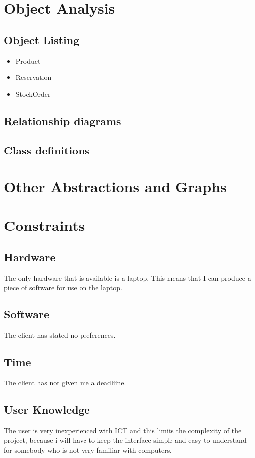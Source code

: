 \section{Object Analysis}


\subsection{Object Listing}
\begin{itemize}
	\item Product
	\item Reservation
	\item StockOrder
\end{itemize}
\subsection{Relationship diagrams}

\subsection{Class definitions}

\section{Other Abstractions and Graphs}

\section{Constraints}

\subsection{Hardware}
The only hardware that is available is a laptop. This means that I can produce a piece of software for use on the laptop.
\subsection{Software}
The client has stated no preferences.
\subsection{Time}
The client has not given me a deadliine.
\subsection{User Knowledge}
The user is very inexperienced with ICT and this limits the complexity of the project, because i will have to keep the interface simple and easy to understand for somebody who is not very familiar with computers.
